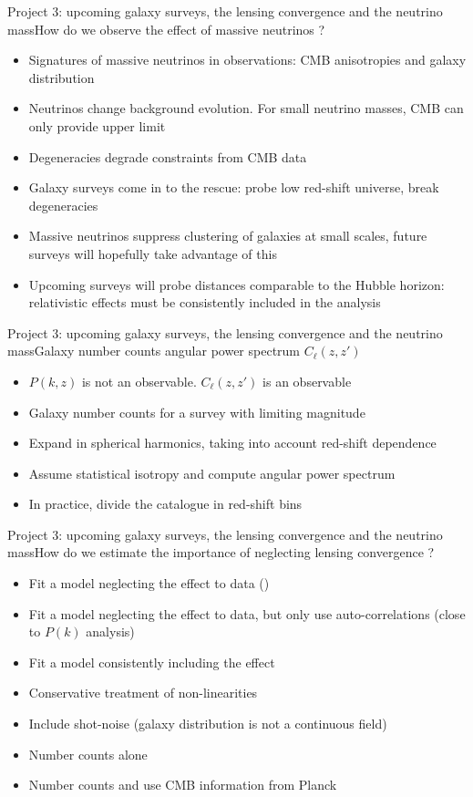 \documentclass{beamer}
\begin{document}
\begin{frame}{Project 3: upcoming galaxy surveys, the lensing convergence and the neutrino mass}{How do we observe the effect of massive neutrinos ?}
\begin{itemize}
\item Signatures of massive neutrinos in observations: CMB anisotropies and galaxy distribution
\item Neutrinos change background evolution. For small neutrino masses, CMB can only provide upper limit 
\item Degeneracies degrade constraints from CMB data
\item Galaxy surveys come in to the rescue: probe low red-shift universe, break degeneracies
\item Massive neutrinos suppress clustering of galaxies at small scales, future surveys will hopefully take advantage of this
\item Upcoming surveys will probe distances comparable to the Hubble horizon: relativistic effects must be consistently included in the analysis
\end{itemize}

\end{frame}

\begin{frame}{Project 3: upcoming galaxy surveys, the lensing convergence and the neutrino mass}{Galaxy number counts angular power spectrum $C_\ell(z,z')$}
\begin{itemize}
\item $P(k,z)$ is not an observable. $C_\ell(z,z')$ is an observable
\item Galaxy number counts for a survey with limiting magnitude
\item Expand in spherical harmonics, taking into account red-shift dependence
\item Assume statistical isotropy and compute angular power spectrum 
\item In practice, divide the catalogue in red-shift bins 
\end{itemize}
\end{frame}

\begin{frame}{Project 3: upcoming galaxy surveys, the lensing convergence and the neutrino mass}{How do we estimate the importance of neglecting lensing convergence ?}
\begin{itemize}
\item Fit a model neglecting the effect to data ()
\item Fit a model neglecting the effect to data, but only use auto-correlations (close to $P(k)$ analysis)
\item Fit a model consistently including the effect 
\item Conservative treatment of non-linearities
\item Include shot-noise (galaxy distribution is not a continuous field)
\item Number counts alone 
\item Number counts and use CMB information from Planck
\end{itemize}
\end{frame}
\end{document}
